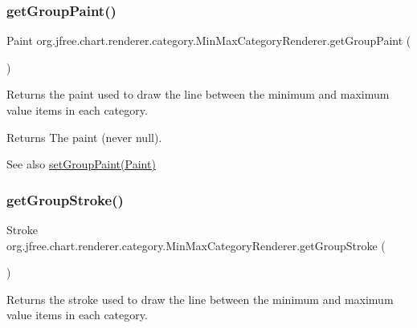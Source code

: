 \subsubsection{\texorpdfstring{get\+Group\+Paint()}{getGroupPaint()}}
{\footnotesize\ttfamily Paint org.\+jfree.\+chart.\+renderer.\+category.\+Min\+Max\+Category\+Renderer.\+get\+Group\+Paint (\begin{DoxyParamCaption}{ }\end{DoxyParamCaption})}

Returns the paint used to draw the line between the minimum and maximum value items in each category.

\begin{DoxyReturn}{Returns}
The paint (never {\ttfamily null}).
\end{DoxyReturn}
\begin{DoxySeeAlso}{See also}
\mbox{\hyperlink{classorg_1_1jfree_1_1chart_1_1renderer_1_1category_1_1_min_max_category_renderer_a15c0d6beff7203d2b49ab160cc7b9124}{set\+Group\+Paint(\+Paint)}} 
\end{DoxySeeAlso}
\mbox{\label{classorg_1_1jfree_1_1chart_1_1renderer_1_1category_1_1_min_max_category_renderer_a4035cc8dee0f3855b46d986e7430cab3}} 
\subsubsection{\texorpdfstring{get\+Group\+Stroke()}{getGroupStroke()}}
{\footnotesize\ttfamily Stroke org.\+jfree.\+chart.\+renderer.\+category.\+Min\+Max\+Category\+Renderer.\+get\+Group\+Stroke (\begin{DoxyParamCaption}{ }\end{DoxyParamCaption})}

Returns the stroke used to draw the line between the minimum and maximum value items in each category.

